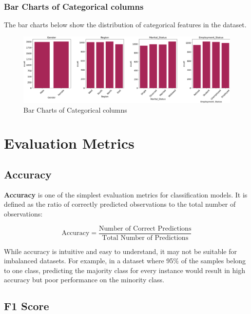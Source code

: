 \documentclass{article}%
\begin{document}
%
\newpage%
\subsubsection{Bar Charts of Categorical columns}%
\label{ssubsec:BarChartsofCategoricalcolumns}%
The bar charts below show the distribution of categorical features in the dataset.%


\begin{figure}[h!]%
\centering%
\includegraphics[width=460px]{EDA/bar_charts.png}%
\caption{Bar Charts of Categorical columns}%
\end{figure}

%
\newpage%
\section{Evaluation Metrics}%
\label{sec:EvaluationMetrics}%
\subsection{Accuracy}%
\label{subsec:Accuracy}%

                \textbf{Accuracy} is one of the simplest evaluation metrics for classification models. 
                It is defined as the ratio of correctly predicted observations to the total number of observations:

                \[
                \text{Accuracy} = \frac{\text{Number of Correct Predictions}}{\text{Total Number of Predictions}}
                \]

                While accuracy is intuitive and easy to understand, it may not be suitable for imbalanced datasets. 
                For example, in a dataset where 95\% of the samples belong to one class, predicting the majority class for every instance 
                would result in high accuracy but poor performance on the minority class.
                

%
\subsection{F1 Score}%
\label{subsec:F1Score}%
\end{document}
